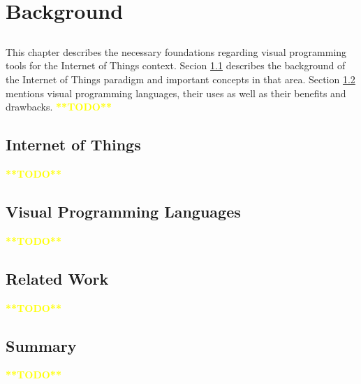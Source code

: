 \chapter{Background} \label{chap:background}

\section*{}


This chapter describes the necessary foundations regarding visual programming tools for the Internet of Things context. Secion \ref{sec:background_iot} describes the background of the Internet of Things paradigm and important concepts in that area. Section \ref{sec:background_vpl} mentions visual programming languages, their uses as well as their benefits and drawbacks.  \textcolor{yellow}{\textbf{**TODO**}}

\section{Internet of Things}\label{sec:background_iot}

\textcolor{yellow}{\textbf{**TODO**}}

\section{Visual Programming Languages}\label{sec:background_vpl}

\textcolor{yellow}{\textbf{**TODO**}}

\section{Related Work}

\textcolor{yellow}{\textbf{**TODO**}}

\section{Summary}

\textcolor{yellow}{\textbf{**TODO**}}
